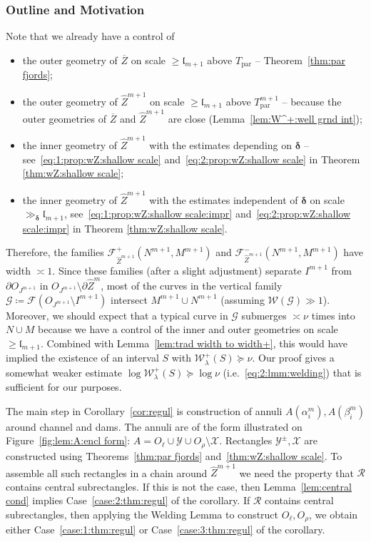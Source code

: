 \documentclass{amsart}
\newcommand{\1}{{\mathbb 1 }}
\newcommand{\FamG}{{\mathcal G}}
\newcommand{\Fam}{{\mathcal F}}
\newcommand{\Width}{{\mathcal W}}
\newcommand\YY{\mathcal{Y}}
\newcommand\RR{\mathcal{R}}
\newcommand\XX{\mathcal{X}}
\newcommand{\wZ}{{\widehat Z}}
\newcommand{\length}{{\mathfrak l}}
\newcommand\parab{{\operatorname{par}}}
\theoremstyle{remark}
\numberwithin{equation}{section}
\theoremstyle{definition}
\newcommand{\bdelta}{{\boldsymbol{ \delta}}}
\begin{document}
\subsubsection{Outline and Motivation} \label{sss:outline of Welding} Note that we already have a control of
\begin{itemize}
\item the outer geometry of $\overline Z$ on scale $\ge \length_{m+1}$ above $T_\parab$ -- Theorem~\ref{thm:par fjords};
\item the outer geometry of $\wZ^{m+1}$ on scale $\ge \length_{m+1}$ above $T_\parab^{m+1}$ -- because the outer geometries of  $\overline Z$ and $\wZ^{m+1}$ are close (Lemma~\ref{lem:W^+:well grnd int});

\item the inner geometry of $\wZ^{m+1}$ with the estimates depending on $\bdelta$ -- see~\eqref{eq:1:prop:wZ:shallow scale} and~\eqref{eq:2:prop:wZ:shallow scale} in Theorem \ref{thm:wZ:shallow scale};  
\item the inner geometry of $\wZ^{m+1}$ with the estimates independent of $\bdelta$ on scale $\gg_{\bdelta} \length_{m+1}$, see~\eqref{eq:1:prop:wZ:shallow scale:impr} and~\eqref{eq:2:prop:wZ:shallow scale:impr} in  Theorem \ref{thm:wZ:shallow scale}.
\end{itemize}
Therefore, the families $\Fam^+_{\wZ^{m+1}}(N^{m+1},M^{m+1})$ and $\Fam^-_{\wZ^{m+1}}(N^{m+1},M^{m+1})$ have width $\asymp 1$. Since these families (after a slight adjustment) separate $I^{m+1}$ from $\partial O_{J^{m+1}}$ in $O_{J^{m+1}}\setminus \partial \wZ^m$, most of the curves in the vertical family 
${\FamG\coloneqq \Fam( O_{J^{m+1}}\setminus I^{m+1})}$ intersect ${M^{m+1}\cup N^{m+1}}$ (assuming $\Width(\FamG)\gg 1$). Moreover, we should expect that a typical curve in $\FamG$ submerges $\asymp \nu$ times into $N\cup M$ because we have a control of the inner and outer geometries on scale $\ge \length_{m+1}$. Combined with Lemma~\ref{lem:trad width to width+}, this would have implied the existence of an interval $S$ with $\Width^+_{\lambda}(S) \succeq   \nu$. Our proof gives a somewhat weaker estimate $\log \Width^+_{\lambda}(S) \succeq  \log \nu$ (i.e.~\eqref{eq:2:lmm:welding}) that is sufficient for our purposes.


The main step in Corollary~\ref{cor:regul} is construction of annuli $A(\alpha^m_i), A(\beta^m_i)$ around channel and dams. The annuli are of the form illustrated on Figure~\ref{fig:lem:A:encl form}: $A=O_\ell \cup \YY \cup O_\rho \setminus \XX$. Rectangles $\YY^\pm, \XX$ are constructed using Theorems~\ref{thm:par fjords} and~\ref{thm:wZ:shallow scale}. To assemble all such rectangles in a chain around $\wZ^{m+1}$ we need the property that $\RR$ contains central subrectangles. If this is not the case, then Lemma~\ref{lem:central cond} implies Case~\eqref{case:2:thm:regul} of the corollary. If $\RR$ contains central subrectangles, then applying the Welding Lemma to construct $O_\ell, O_\rho$, we obtain either Case~\eqref{case:1:thm:regul}  or Case~\eqref{case:3:thm:regul} of the corollary.
\end{document}
